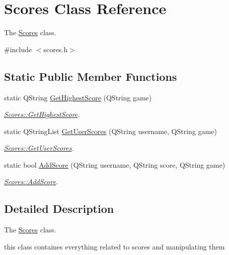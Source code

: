\hypertarget{classScores}{\section{Scores Class Reference}
\label{classScores}
}


The \hyperlink{classScores}{Scores} class.  




{\ttfamily \#include $<$scores.\-h$>$}

\subsection*{Static Public Member Functions}
\begin{DoxyCompactItemize}
\item 
static Q\-String \hyperlink{classScores_aa958c1c60267d4f682eb9e2580f94427}{Get\-Highest\-Score} (Q\-String game)
\begin{DoxyCompactList}\small\item\em \hyperlink{classScores_aa958c1c60267d4f682eb9e2580f94427}{Scores\-::\-Get\-Highest\-Score}. \end{DoxyCompactList}\item 
static Q\-String\-List \hyperlink{classScores_a73494bf10c0c62fada10f000086151f2}{Get\-User\-Scores} (Q\-String username, Q\-String game)
\begin{DoxyCompactList}\small\item\em \hyperlink{classScores_a73494bf10c0c62fada10f000086151f2}{Scores\-::\-Get\-User\-Scores}. \end{DoxyCompactList}\item 
static bool \hyperlink{classScores_a9b43bd9811f2582dbadb6021eaf6b193}{Add\-Score} (Q\-String username, Q\-String score, Q\-String game)
\begin{DoxyCompactList}\small\item\em \hyperlink{classScores_a9b43bd9811f2582dbadb6021eaf6b193}{Scores\-::\-Add\-Score}. \end{DoxyCompactList}\end{DoxyCompactItemize}


\subsection{Detailed Description}
The \hyperlink{classScores}{Scores} class. 

this class containes everything related to scores and manipulating them 

